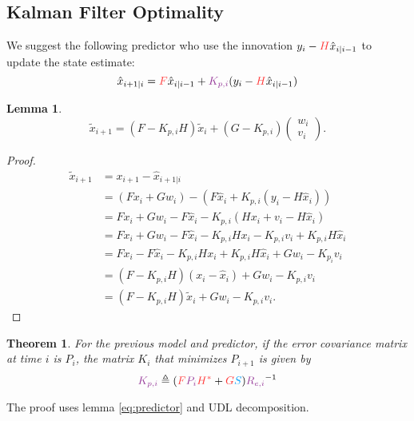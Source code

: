 \documentclass[a4 paper]{article}
\numberwithin{equation}{section}
\theoremstyle{boldStyle}
\theoremstyle{boldBlueStyle}
\newtheorem{lemma}{Lemma}[section]
\theoremstyle{boldPurpleStyle}
\newtheorem{theorem}{Theorem}[section]
\theoremstyle{boldRedStyle}
\theoremstyle{boldGreenStyle}
\begin{document}
\subsection*{Kalman Filter Optimality}

We suggest the following predictor who use the innovation \( y_i - \tred{H} \hat{x}_{i|i-1} \) to update the state estimate:
\begin{equation} \label{eq:predictor}
    \hat{x}_{i+1|i} = \tred{F} \hat{x}_{i|i-1} + \tpur{K_{p,i}} (y_i - \tred{H} \hat{x}_{i|i-1})
\end{equation}

\begin{lemma} 
  \begin{equation}
    \tilde{x}_{i+1} = (F - K_{p,i} H) \tilde{x}_i + (G - K_{p,i}) 
    \begin{pmatrix}
    w_i \\
    v_i
    \end{pmatrix}.
    \end{equation}
\end{lemma}

\begin{proof}
\begin{align*}
\tilde{x}_{i+1} &= x_{i+1} - \hat{x}_{i+1|i} \\
&= (F x_i + G w_i) - \left( F \hat{x}_i + K_{p,i} (y_i - H \hat{x}_i) \right) \\
&= F x_i + G w_i - F \hat{x}_i - K_{p,i} (H x_i + v_i - H \hat{x}_i) \\
&= F x_i + G w_i - F \hat{x}_i - K_{p,i} H x_i - K_{p,i} v_i + K_{p,i} H \hat{x}_i \\
&= F x_i - F \hat{x}_i - K_{p,i} H x_i + K_{p,i} H \hat{x}_i + G w_i - K_{p_i} v_i \\
&= (F - K_{p,i} H)(x_i - \hat{x}_i) + G w_i - K_{p,i} v_i \\
&= (F - K_{p,i} H) \tilde{x}_i + G w_i - K_{p,i} v_i.
\end{align*}
\end{proof}


\begin{theorem}
  For the previous model and predictor, if the error covariance matrix at time \(i\) is $P_i$,
  the matrix \(K_i\) that minimizes \(P_{i+1}\) is given by
  \[
    \tpur{K_{p,i}} \triangleq (\tred{F} \tpur{P_i} \tred{H^*} + \tred{G}\tblu{S}) \tpur{R_{e,i}}^{-1}
  \]
\end{theorem}

The proof uses lemma \ref{eq:predictor} and UDL decomposition.
\end{document}

